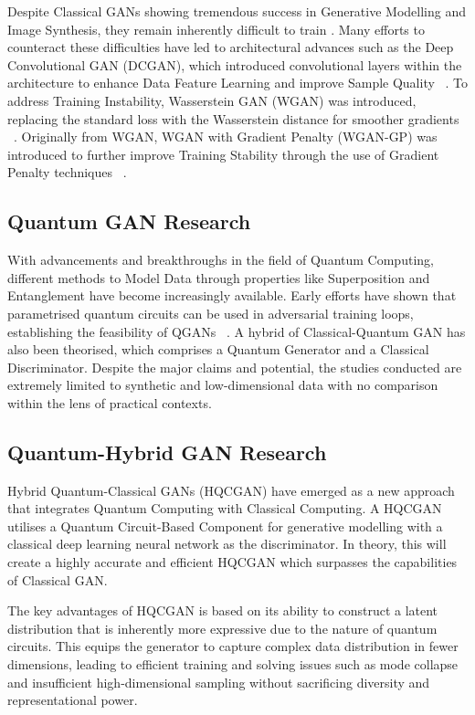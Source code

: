 \documentclass[conference]{IEEEtran}
\begin{document}
Despite Classical GANs showing tremendous success in Generative Modelling and Image Synthesis, they remain inherently difficult to train \cite{b3}. Many efforts to counteract these difficulties have led to architectural advances such as the Deep Convolutional GAN (DCGAN), which introduced convolutional layers within the architecture to enhance Data Feature Learning and improve Sample Quality ~\cite{b4}. To address Training Instability, Wasserstein GAN (WGAN) was introduced, replacing the standard loss with the Wasserstein distance for smoother gradients ~\cite{b5}. Originally from WGAN, WGAN with Gradient Penalty (WGAN-GP) was introduced to further improve Training Stability through the use of Gradient Penalty techniques ~\cite{b6}.

\subsection{Quantum GAN Research}

With advancements and breakthroughs in the field of Quantum Computing, different methods to Model Data through properties like Superposition and Entanglement have become increasingly available. Early efforts have shown that parametrised quantum circuits can be used in adversarial training loops, establishing the feasibility of QGANs ~\cite{b2}. A hybrid of Classical-Quantum GAN has also been theorised, which comprises a Quantum Generator and a Classical Discriminator. Despite the major claims and potential, the studies conducted are extremely limited to synthetic and low-dimensional data with no comparison within the lens of practical contexts.

\subsection{Quantum-Hybrid GAN Research}

Hybrid Quantum-Classical GANs (HQCGAN) have emerged as a new approach that integrates Quantum Computing with Classical Computing. A HQCGAN utilises a Quantum Circuit-Based Component for generative modelling with a classical deep learning neural network as the discriminator. In theory, this will create a highly accurate and efficient HQCGAN which surpasses the capabilities of Classical GAN.

The key advantages of HQCGAN is based on its ability to construct a latent distribution that is inherently more expressive due to the nature of quantum circuits. This equips the generator to capture complex data distribution in fewer dimensions, leading to efficient training and solving issues such as mode collapse and insufficient high-dimensional sampling without sacrificing diversity and representational power.
\end{document}
